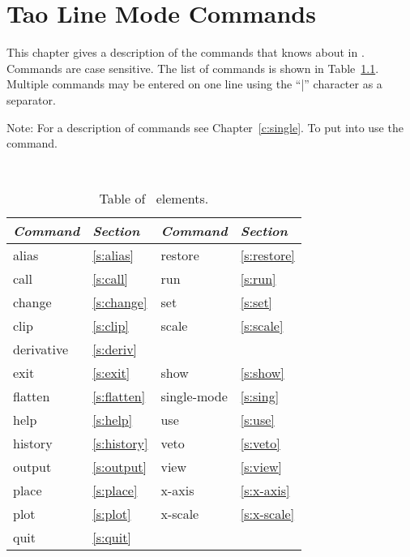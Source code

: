 \chapter{Tao Line Mode Commands}
\label{c:command}

This chapter gives a description of the commands that \tao knows about
in . Commands are case sensitive. The list of commands
is shown in Table~\ref{t:commands}. Multiple commands may be entered
on one line using the ``|'' character as a separator.

Note: For a description of  commands see
Chapter~\ref{c:single}. To put \tao into  use the
 command. 

\begin{table}[h]
\centering
{\tt
\begin{tabular}{|l|l||l|l|} \hline
  {\it Command} & {\it Section}  & {\it Command} & {\it Section} \\ \hline
  alias      & \ref{s:alias}    &  restore     & \ref{s:restore} \\ \hline
  call       & \ref{s:call}     &  run         & \ref{s:run}     \\ \hline
  change     & \ref{s:change}   &  set         & \ref{s:set}     \\ \hline
  clip       & \ref{s:clip}     &  scale       & \ref{s:scale}   \\ \hline
  derivative & \ref{s:deriv}    &              &                 \\ \hline
  exit       & \ref{s:exit}     &  show        & \ref{s:show}    \\ \hline
  flatten    & \ref{s:flatten}  &  single-mode & \ref{s:sing}    \\ \hline
  help       & \ref{s:help}     &  use         & \ref{s:use}     \\ \hline
  history    & \ref{s:history}  &  veto        & \ref{s:veto}    \\ \hline
  output     & \ref{s:output}   &  view        & \ref{s:view}    \\ \hline
  place      & \ref{s:place}    &  x-axis      & \ref{s:x-axis}  \\ \hline
  plot       & \ref{s:plot}     &  x-scale     & \ref{s:x-scale} \\ \hline
  quit       & \ref{s:quit}     &              &                 \\ \hline
\end{tabular}
}
\caption{Table of \bmad\ elements.}
\label{t:commands}
\end{table}

